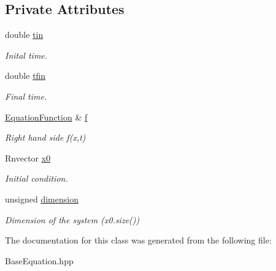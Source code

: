 \subsection*{Private Attributes}
\begin{DoxyCompactItemize}
\item 
\mbox{\label{classBaseEquation_a9003149a3218fd7994c18914cd4446b8}} 
double \hyperlink{classBaseEquation_a9003149a3218fd7994c18914cd4446b8}{tin}
\begin{DoxyCompactList}\small\item\em Inital time. \end{DoxyCompactList}\item 
\mbox{\label{classBaseEquation_a5286836cab7d0366681863c8cda0d45b}} 
double \hyperlink{classBaseEquation_a5286836cab7d0366681863c8cda0d45b}{tfin}
\begin{DoxyCompactList}\small\item\em Final time. \end{DoxyCompactList}\item 
\mbox{\label{classBaseEquation_ae7bf8243e94cd4cd762345048849a967}} 
\hyperlink{structEquationFunction}{Equation\+Function} \& \hyperlink{classBaseEquation_ae7bf8243e94cd4cd762345048849a967}{f}
\begin{DoxyCompactList}\small\item\em Right hand side f(x,t) \end{DoxyCompactList}\item 
\mbox{\label{classBaseEquation_a86cd7c1803bac9d80e15b4dc81571fa7}} 
Rnvector \hyperlink{classBaseEquation_a86cd7c1803bac9d80e15b4dc81571fa7}{x0}
\begin{DoxyCompactList}\small\item\em Initial condition. \end{DoxyCompactList}\item 
\mbox{\label{classBaseEquation_ad57b2ae84acedfb6d38b70e08dc39db3}} 
unsigned \hyperlink{classBaseEquation_ad57b2ae84acedfb6d38b70e08dc39db3}{dimension}
\begin{DoxyCompactList}\small\item\em Dimension of the system (x0.\+size()) \end{DoxyCompactList}\end{DoxyCompactItemize}


The documentation for this class was generated from the following file\+:\begin{DoxyCompactItemize}
\item 
Base\+Equation.\+hpp\end{DoxyCompactItemize}
